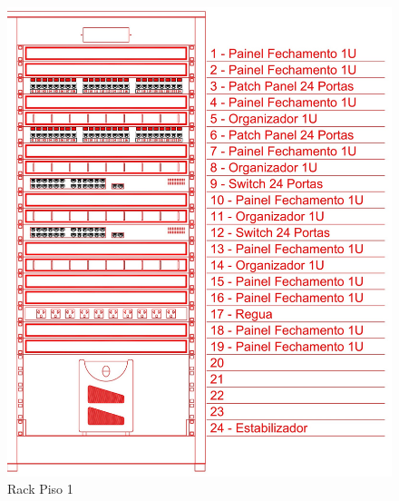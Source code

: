 \documentclass[	DIV=calc,%
							paper=a4,%
							fontsize=12pt,%
							onecolumn]{scrartcl}	 					%
\begin{document}
\begin{figure}
	\centering
	\includegraphics[width=\textwidth]{rack_p1}
	\caption{Rack Piso 1}
	\label{rack_p1}
\end{figure}
\FloatBarrier
\end{document}
